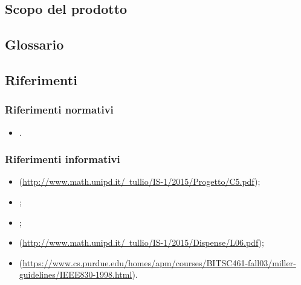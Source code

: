\documentclass[a4paper, titlepage]{article}
\begin{document}
\subsection{Scopo del prodotto}
\SCOPO

\subsection{Glossario}
\GLOSSARIO

\subsection{Riferimenti}
\subsubsection{Riferimenti normativi}
\begin{itemize}
\item {} .
\end{itemize}

\subsubsection{Riferimenti informativi}
\begin{itemize}
\item {}  (\href{http://www.math.unipd.it/~tullio/IS-1/2015/Progetto/C5.pdf}{http://www.math.unipd.it/~tullio/IS-1/2015/Progetto/C5.pdf});

\item {} ;

\item {} ;

\item {}  (\href{http://www.math.unipd.it/~tullio/IS-1/2015/Dispense/L06.pdf}{http://www.math.unipd.it/~tullio/IS-1/2015/Dispense/L06.pdf});

\item {}  (\href{https://www.cs.purdue.edu/homes/apm/courses/BITSC461-fall03/miller-guidelines/IEEE830-1998.html}{https://www.cs.purdue.edu/homes/apm/courses/BITSC461-fall03/miller-guidelines/IEEE830-1998.html}).

\end{itemize}
\end{document}
